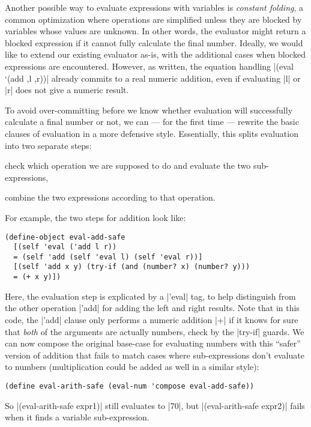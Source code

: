 Another possible way to evaluate expressions with variables is \emph{constant folding}, a common optimization where operations are simplified unless they are blocked by variables whose values are unknown.
In other words, the evaluator might return a blocked expression if it cannot fully calculate the final number.
Ideally, we would like to extend our existing evaluator as-is, with the additional cases when blocked expressions are encountered.  
However, as written, the equation handling \scm|(eval `(add ,l ,r))| already commits to a real numeric addition, even if evaluating \scm|l| or \scm|r| does not give a numeric result.

To avoid over-committing before we know whether evaluation will successfully calculate a final number or not, we can --- for the first time --- rewrite the basic clauses of evaluation in a more defensive style.
Essentially, this splits evaluation into two separate steps:
\begin{enumerate*}[(1)]
\item check which operation we are supposed to do and evaluate the two sub-expressions,
\item combine the two expressions according to that operation.
\end{enumerate*}
For example, the two steps for addition look like:
\begin{verbatim} 
(define-object eval-add-safe
  [(self 'eval ('add l r))
  = (self 'add (self 'eval l) (self 'eval r))]
  [(self 'add x y) (try-if (and (number? x) (number? y)))
  = (+ x y)])
\end{verbatim}
Here, the evaluation step is explicated by a \scm|'eval| tag, to help distinguish from the other operation \scm|'add| for adding the left and right results.
Note that in this code, the \scm|'add| clause only performs a numeric addition \scm|+| if it knows for sure that \emph{both} of the arguments are actually numbers, check by the \scm|try-if| guards.
We can now compose the original base-case for evaluating numbers with this ``safer'' version of addition that fails to match cases where sub-expressions don't evaluate to numbers (multiplication could be added as well in a similar style):
\begin{verbatim}
(define eval-arith-safe (eval-num 'compose eval-add-safe))
\end{verbatim}
So \scm|(eval-arith-safe expr1)| still evaluates to \scm|70|, but \scm|(eval-arith-safe expr2)| fails when it finds a variable sub-expression.

